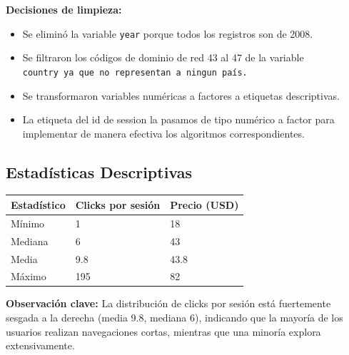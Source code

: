 \documentclass[
  11pt,
  letterpaper,
  DIV=11,
  numbers=noendperiod]{scrartcl}
\newcounter{none} %
\begin{document}
\textbf{\hfill\break
Decisiones de limpieza:}

\begin{itemize}
\item
  Se eliminó la variable \texttt{year} porque todos los registros son de
  2008.
\item
  Se filtraron los códigos de dominio de red 43 al 47 de la variable
  \texttt{country\ ya\ que\ no\ representan\ a\ ningun\ país.}
\item
  Se transformaron variables numéricas a factores a etiquetas
  descriptivas.
\item
  La etiqueta del id de session la pasamos de tipo numérico a factor
  para implementar de manera efectiva los algoritmos correspondientes.
\end{itemize}

\subsection{Estadísticas
Descriptivas}\label{estaduxedsticas-descriptivas}

{\def\LTcaptype{none} %
\begin{longtable}[]{@{}lll@{}}
\toprule\noalign{}
Estadístico & Clicks por sesión & Precio (USD) \\
\midrule\noalign{}
\endhead
\bottomrule\noalign{}
\endlastfoot
Mínimo & 1 & 18 \\
Mediana & 6 & 43 \\
Media & 9.8 & 43.8 \\
Máximo & 195 & 82 \\
\end{longtable}
}

\textbf{Observación clave:} La distribución de clicks por sesión está
fuertemente sesgada a la derecha (media 9.8, mediana 6), indicando que
la mayoría de los usuarios realizan navegaciones cortas, mientras que
una minoría explora extensivamente.
\end{document}
